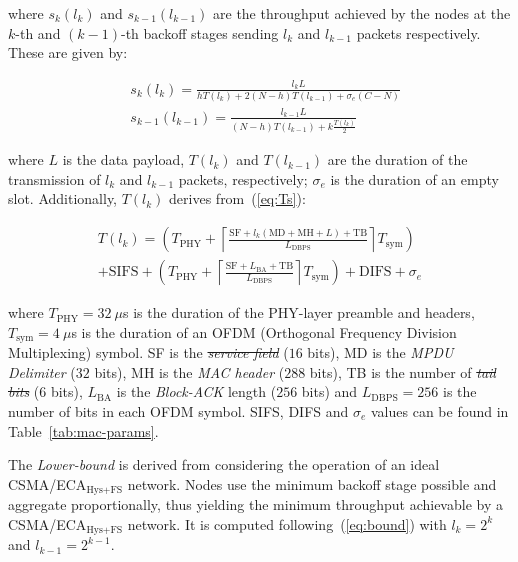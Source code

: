 \documentclass[a4paper,journal]{IEEEtran}
\providecommand{\DIFaddtex}[1]{{\protect\color{blue}\uwave{#1}}} %
\providecommand{\DIFdeltex}[1]{{\protect\color{red}\sout{#1}}}                      %
\providecommand{\DIFaddbegin}{} %
\providecommand{\DIFaddend}{} %
\providecommand{\DIFdelbegin}{} %
\providecommand{\DIFdelend}{} %
\providecommand{\DIFadd}[1]{\texorpdfstring{\DIFaddtex{#1}}{#1}} %
\providecommand{\DIFdel}[1]{\texorpdfstring{\DIFdeltex{#1}}{}} %
\begin{document}
	where $s_{k}(l_{k})$ and $s_{k-1}(l_{k-1})$ are the throughput achieved by the nodes at the $k$-th and $(k-1)$-th backoff stages sending $l_{k}$ and $l_{k-1}$ packets respectively. These are given by:

	\begin{subequations}
		\begin{align}
			&s_{k}(l_{k}) = \frac{l_{k} L}{hT(l_{k})+2(N-h)T(l_{k-1}) + \sigma_{e}(C - N)}\label{eq:HighNodes}\\
			&s_{k-1}(l_{k-1}) = \frac{l_{k-1} L}{(N-h)T(l_{k-1}) + k\frac{T(l_{k})}{2}}\label{eq:LowNodes}
		\end{align}
	\end{subequations}

	where $L$ is the data payload, $T(l_{k})$ and $T(l_{k-1})$ are the duration of the transmission of $l_{k}$ and $l_{k-1}$ packets, respectively; $\sigma_{e}$ is the duration of an empty slot. Additionally, $T(l_{k})$ derives from~(\ref{eq:Ts}):

	\begin{multline}\label{eq:Ts}
		T(l_{k})= \left( T_{\text{PHY}} + \left\lceil \frac{ \text{SF} + l_{k} (\text{MD}+\text{MH}+L) + \text{TB}}{L_{\text{DBPS}}}\right\rceil T_{\text{sym}} \right) \\ 
		+ \text{SIFS}+\left(T_{\text{PHY}} + \left\lceil\frac{\text{SF} + L_{\text{BA}} + \text{TB}}{L_{\text{DBPS}}} \right \rceil T_{\text{sym}} \right) + \text{DIFS} + \sigma_{e}
	\end{multline}

	where $T_{\text{PHY}}=32~\mu$s is the duration of the PHY-layer preamble and headers, $T_{\text{sym}}=4~\mu$s is the duration of an OFDM (Orthogonal Frequency Division Multiplexing) symbol. SF is the \emph{\DIFdelbegin \DIFdel{service field}\DIFdelend \DIFaddbegin \DIFadd{Service Field}\DIFaddend } ($16$ bits), $\text{MD}$ is the \textit{MPDU Delimiter} ($32$ bits), MH is the \emph{MAC header} ($288$ bits), TB is the number of \emph{\DIFdelbegin \DIFdel{tail bits}\DIFdelend \DIFaddbegin \DIFadd{Tail Bits}\DIFaddend } ($6$ bits), $L_{\text{BA}}$ is the \emph{Block-ACK} length ($256$ bits) and $L_{\text{DBPS}}=256$ is the number of bits in each OFDM symbol. SIFS, DIFS and $\sigma_{e}$ values can be found in Table~\ref{tab:mac-params}.

	The \emph{Lower-bound} is derived from considering the operation of an ideal CSMA/ECA$_{\text{Hys+FS}}$ network. Nodes use the minimum backoff stage possible and aggregate proportionally, thus yielding the minimum throughput achievable by a CSMA/ECA$_{\text{Hys+FS}}$ network. It is computed following~(\ref{eq:bound}) with $l_{k}=2^{k}$ and $l_{k-1}=2^{k-1}$.
\end{document}
